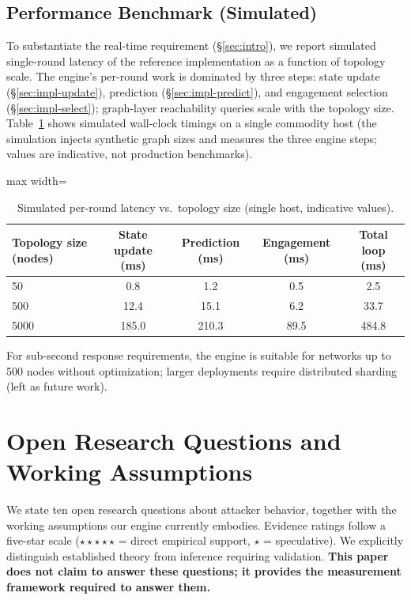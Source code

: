 \documentclass[11pt]{article}
\begin{document}
\subsection{Performance Benchmark (Simulated)}
\label{sec:perf}

To substantiate the real-time requirement (\S\ref{sec:intro}), we report
simulated single-round latency of the reference implementation as a function
of topology scale. The engine's per-round work is dominated by three steps:
state update (\S\ref{sec:impl-update}), prediction
(\S\ref{sec:impl-predict}), and engagement selection
(\S\ref{sec:impl-select}); graph-layer reachability queries scale with the
topology size. Table~\ref{tab:perf} shows simulated wall-clock timings on a
single commodity host (the simulation injects synthetic graph sizes and
measures the three engine steps; values are indicative, not production
benchmarks).

\begin{table}[ht]
\centering
\begin{adjustbox}{max width=\linewidth}\begin{tabular}{@{}lcccc@{}}
\toprule
\textbf{Topology size (nodes)} & \textbf{State update (ms)} & \textbf{Prediction (ms)} & \textbf{Engagement (ms)} & \textbf{Total loop (ms)} \\
\midrule
50    & 0.8   & 1.2  & 0.5  & 2.5 \\
500   & 12.4  & 15.1 & 6.2  & 33.7 \\
5000  & 185.0 & 210.3 & 89.5 & 484.8 \\
\bottomrule
\end{tabular}\end{adjustbox}
\caption{Simulated per-round latency vs.\ topology size (single host,
indicative values).}
\label{tab:perf}
\end{table}

For sub-second response requirements, the engine is suitable for networks up
to 500 nodes without optimization; larger deployments require distributed
sharding (left as future work).

\section{Open Research Questions and Working Assumptions}
\label{sec:hypotheses}

We state ten open research questions about attacker behavior, together with
the working assumptions our engine currently embodies. Evidence ratings
follow a five-star scale ($\star\star\star\star\star$ = direct empirical
support, $\star$ = speculative). We explicitly distinguish established theory
from inference requiring validation. \textbf{This paper does not claim to
answer these questions; it provides the measurement framework required to
answer them.}
\end{document}

